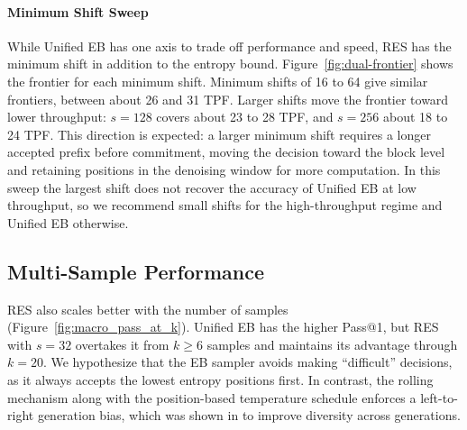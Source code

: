 \paragraph{Minimum Shift Sweep}
While Unified EB has one axis to trade off performance and speed, RES has the minimum shift in addition to the entropy bound.
Figure~\ref{fig:dual-frontier} shows the frontier for each minimum shift.
Minimum shifts of 16 to 64 give similar frontiers, between about 26 and 31 TPF.
Larger shifts move the frontier toward lower throughput: $s=128$ covers about 23 to 28 TPF, and $s=256$ about 18 to 24 TPF.
This direction is expected: a larger minimum shift requires a longer accepted prefix before commitment, moving the decision toward the block level and retaining positions in the denoising window for more computation.
In this sweep the largest shift does not recover the accuracy of Unified EB at low throughput, so we recommend small shifts for the high-throughput regime and Unified EB otherwise.

\subsection{Multi-Sample Performance}
RES also scales better with the number of samples (Figure~\ref{fig:macro_pass_at_k}).
Unified EB has the higher Pass@1, but RES with $s=32$ overtakes it from $k \ge 6$ samples and maintains its advantage through $k=20$.
We hypothesize that the EB sampler avoids making ``difficult'' decisions, as it always accepts the lowest entropy positions first.
In contrast, the rolling mechanism along with the position-based temperature schedule enforces a left-to-right generation bias, which was shown in \citet{ni2026flexibility} to improve diversity across generations.
